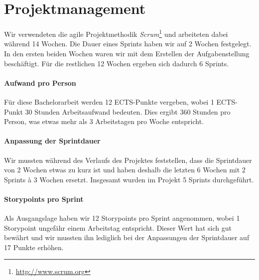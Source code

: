 \chapter{Projektmanagement}
\label{projektmanagement}

Wir verwendeten die agile Projektmethodik \emph{Scrum}\footnote{\url{http://www.scrum.org}} und arbeiteten dabei während 14 Wochen.
Die Dauer eines Sprints haben wir auf 2 Wochen festgelegt.
In den ersten beiden Wochen waren wir mit dem Erstellen der Aufgabenstellung beschäftigt.
Für die restlichen 12 Wochen ergeben sich dadurch 6 Sprints.

\subsubsection{Aufwand pro Person}
Für diese Bachelorarbeit werden 12 ECTS-Punkte vergeben, wobei 1 ECTS-Punkt 30 Stunden Arbeitsaufwand bedeuten.
Dies ergibt 360 Stunden pro Person, was etwas mehr als 3 Arbeitstagen pro Woche entspricht.

\subsubsection{Anpassung der Sprintdauer}
Wir mussten während des Verlaufs des Projektes feststellen, dass die Sprintdauer von 2 Wochen etwas zu kurz ist und haben deshalb die letzten 6 Wochen mit 2 Sprints à 3 Wochen ersetzt.
Insgesamt wurden im Projekt 5 Sprints durchgeführt. 

\subsubsection{Storypoints pro Sprint}
Als Ausgangslage haben wir 12 Storypoints pro Sprint angenommen, wobei 1 Storypoint ungefähr einem Arbeitstag entspricht. 
Dieser Wert hat sich gut bewährt und wir mussten ihn lediglich bei der Anpassungen der Sprintdauer auf 17 Punkte erhöhen.









